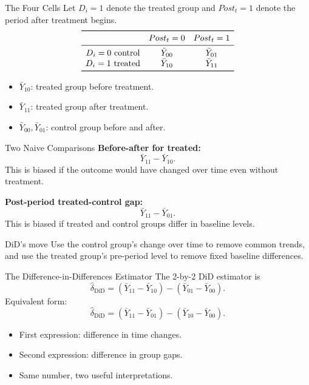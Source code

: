 \documentclass[11pt,aspectratio=169]{beamer}
\newcommand{\derivbutton}[1]{\vspace{0.4em}\hfill\hyperlink{app:#1}{\beamerbutton{Appendix details}}}
\begin{document}
\begin{frame}{The Four Cells}
  Let \(D_i=1\) denote the treated group and \(Post_t=1\) denote the period after treatment begins.
  \[
  \begin{array}{c c c}
  \toprule
  & Post_t=0 & Post_t=1 \\
  \midrule
  D_i=0\ \text{control} & \bar Y_{00} & \bar Y_{01} \\
  D_i=1\ \text{treated} & \bar Y_{10} & \bar Y_{11} \\
  \bottomrule
  \end{array}
  \]
  \vspace{0.6em}
  \begin{itemize}
    \item \(\bar Y_{10}\): treated group before treatment.
    \item \(\bar Y_{11}\): treated group after treatment.
    \item \(\bar Y_{00},\bar Y_{01}\): control group before and after.
  \end{itemize}
\end{frame}

\begin{frame}{Two Naive Comparisons}
  \textbf{Before-after for treated:}
  \[
    \bar Y_{11}-\bar Y_{10}.
  \]
  This is biased if the outcome would have changed over time even without treatment.

  \vspace{0.8em}
  \textbf{Post-period treated-control gap:}
  \[
    \bar Y_{11}-\bar Y_{01}.
  \]
  This is biased if treated and control groups differ in baseline levels.

  \begin{block}{DiD's move}
    Use the control group's change over time to remove common trends, and use the treated group's pre-period level to remove fixed baseline differences.
  \end{block}
\end{frame}

\begin{frame}{The Difference-in-Differences Estimator}
  \hypertarget{main:did-estimator}{}
  The 2-by-2 DiD estimator is
  \[
    \hat\delta_{\mathrm{DiD}}
    =
    (\bar Y_{11}-\bar Y_{10})
    -
    (\bar Y_{01}-\bar Y_{00}).
  \]
  Equivalent form:
  \[
    \hat\delta_{\mathrm{DiD}}
    =
    (\bar Y_{11}-\bar Y_{01})
    -
    (\bar Y_{10}-\bar Y_{00}).
  \]
  \begin{itemize}
    \item First expression: difference in time changes.
    \item Second expression: difference in group gaps.
    \item Same number, two useful interpretations.
  \end{itemize}
  \derivbutton{did-algebra}
\end{frame}
\end{document}
